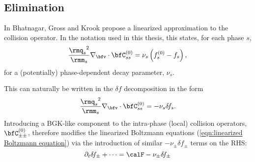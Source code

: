 \subsection*{Elimination}
    \begin{definition}
        In \cite{Bhatnagar_Gross_Krook_1954} Bhatnagar, Gross and Krook propose a linearized approximation to the collision operator. In the notation used in this thesis, this states, for each phase $s$,
        \begin{equation}
            \frac{{\rmq_{s}}^{2}}{\rmm_{s}}\nabla_{\bfv}\cdot\bfC_{ss}^{(0)}  =  \nu_{s}\left(f_{s}^{(0)} - f_{s}\right),
        \end{equation}
        for a (potentially) phase-dependent decay parameter, $\nu_{s}$.
    \end{definition}
    This can naturally be written in the $\delta\!f$ decomposition in the form
    \begin{equation}
        \frac{{\rmq_{s}}^{2}}{\rmm_{s}}\nabla_{\bfv}\cdot\bfC_{ss}^{(0)}  =  - \nu_{s}\delta\!f_{s}.
     \end{equation}
    Introducing a BGK-like component to the intra-phase (local) collision operators, $\bfC_{\pm\pm}^{(0)}$, therefore modifies the linearized Boltzmann equations (\ref{eqn:linearized Boltzmann equation}) via the introduction of similar $- \nu_{\pm}\delta\!f_{\pm}$ terms on the RHS:
    \begin{equation}
        \partial_{t}\delta\!f_{\pm} + \cdots  =  \calF - \nu_{\pm}\delta\!f_{\pm}
    \end{equation}


    